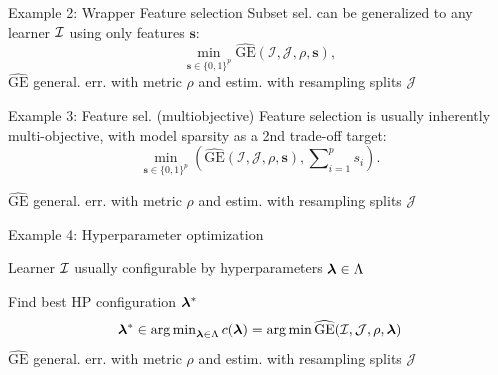 \documentclass[11pt,compress,t,notes=noshow, xcolor=table]{beamer}
\begin{document}
\begin{framev}{Example 2: Wrapper Feature selection}
Subset sel. can be generalized to any learner $\mathcal{I}$ using only features $\bm{s}$:
$$
\min_{\textbf{s} \in \{0, 1\}^p} \widehat{\text{GE}}(\mathcal{I}, \mathcal{J}, \rho, \bm{s}),
$$
$\widehat{\text{GE}}$ general. err. with metric $\rho$ and estim. with resampling splits $\mathcal{J}$
\spacer
{}
\end{framev}


\begin{framev}{Example 3: Feature sel. (multiobjective)}
Feature selection is usually inherently multi-objective,
with model sparsity as a 2nd trade-off target:
$$
\min_{\textbf{s} \in \{0, 1\}^p} \left(\widehat{\text{GE}}(\mathcal{I}, \mathcal{J}, \rho, \bm{s}), \sum\nolimits_{i = 1}^p s_i\right).
$$

$\widehat{\text{GE}}$ general. err. with metric $\rho$ and estim. with resampling splits $\mathcal{J}$
\spacer
{}
\end{framev}


\begin{framei}{Example 4: Hyperparameter optimization}
\item Learner $\mathcal{I}$ usually configurable by hyperparameters $\bm{\lambda} \in \Lambda$
\item Find best HP configuration $\bm{\lambda}^\ast$
$$
\bm{\lambda}^\ast \in \mathop{\mathrm{arg\,min}}\nolimits_{\bm{\lambda} \in \Lambda} c(\bm{\lambda}) = \mathop{\mathrm{arg\,min}} \widehat{\text{GE}}(\mathcal{I}, \mathcal{J}, \rho, \bm{\lambda})
$$
$\widehat{\text{GE}}$ general. err. with metric $\rho$ and estim. with resampling splits $\mathcal{J}$
\spacer
{}
\end{framei}
\end{document}
